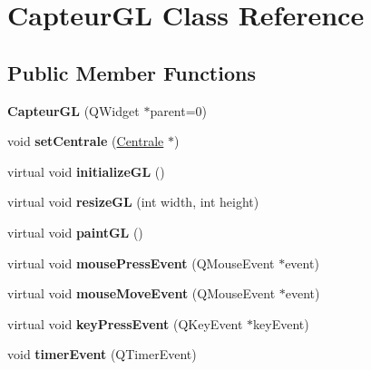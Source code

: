 \hypertarget{class_capteur_g_l}{\section{Capteur\-G\-L Class Reference}
\label{class_capteur_g_l}
}
\subsection*{Public Member Functions}
\begin{DoxyCompactItemize}
\item 
\hypertarget{class_capteur_g_l_a124803898394b85d5e1d89abc51fb2a5}{{\bfseries Capteur\-G\-L} (Q\-Widget $\ast$parent=0)}\label{class_capteur_g_l_a124803898394b85d5e1d89abc51fb2a5}

\item 
\hypertarget{class_capteur_g_l_a4123ccf07d34a5210c3e88addd9cf72a}{void {\bfseries set\-Centrale} (\hyperlink{class_centrale}{Centrale} $\ast$)}\label{class_capteur_g_l_a4123ccf07d34a5210c3e88addd9cf72a}

\item 
\hypertarget{class_capteur_g_l_a39d48f15472a7c5839cb2814d52a9579}{virtual void {\bfseries initialize\-G\-L} ()}\label{class_capteur_g_l_a39d48f15472a7c5839cb2814d52a9579}

\item 
\hypertarget{class_capteur_g_l_a6d8a65da4cc9d4fb814d2d3ae2d9a05e}{virtual void {\bfseries resize\-G\-L} (int width, int height)}\label{class_capteur_g_l_a6d8a65da4cc9d4fb814d2d3ae2d9a05e}

\item 
\hypertarget{class_capteur_g_l_a7116fbd3ea36f2113d64f6ee3b2ca34b}{virtual void {\bfseries paint\-G\-L} ()}\label{class_capteur_g_l_a7116fbd3ea36f2113d64f6ee3b2ca34b}

\item 
\hypertarget{class_capteur_g_l_af2d0fc354a90c08fe5b943bbac35cf54}{virtual void {\bfseries mouse\-Press\-Event} (Q\-Mouse\-Event $\ast$event)}\label{class_capteur_g_l_af2d0fc354a90c08fe5b943bbac35cf54}

\item 
\hypertarget{class_capteur_g_l_ab9ea2f064ee99884a21b3b0126e6536f}{virtual void {\bfseries mouse\-Move\-Event} (Q\-Mouse\-Event $\ast$event)}\label{class_capteur_g_l_ab9ea2f064ee99884a21b3b0126e6536f}

\item 
\hypertarget{class_capteur_g_l_a26dd9ba7f14c1c9de6bdaa42fa83ba55}{virtual void {\bfseries key\-Press\-Event} (Q\-Key\-Event $\ast$key\-Event)}\label{class_capteur_g_l_a26dd9ba7f14c1c9de6bdaa42fa83ba55}

\item 
\hypertarget{class_capteur_g_l_af39d118dccbad888d477a34e96db53ca}{void {\bfseries timer\-Event} (Q\-Timer\-Event)}\label{class_capteur_g_l_af39d118dccbad888d477a34e96db53ca}

\end{DoxyCompactItemize}
